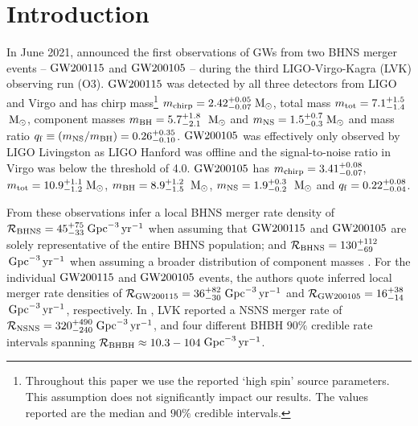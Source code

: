 \documentclass{aastex63}
\newcommand{\Msun}{\ensuremath{\,\rm{M}_{\odot}}\xspace}
\newcommand{\mnsf}{\ensuremath{m_{\rm{NS}}}\xspace}
\newcommand{\mbhf}{\ensuremath{m_{\rm{BH}}}\xspace}
\newcommand{\mtotf}{\ensuremath{m_{\rm{tot}}}\xspace}
\newcommand{\mchirpf}{\ensuremath{{m}_{\rm{chirp}}}\xspace}
\newcommand{\qf}{\ensuremath{q_{\rm{f}}}\xspace}
\newcommand{\Rgwone}{\ensuremath{\mathcal{R}_{\rm{GW200115}}}\xspace}
\newcommand{\Rgwzero}{\ensuremath{\mathcal{R}_{\rm{GW200105}}}\xspace}
\newcommand{\Rbhns}{\ensuremath{\mathcal{R}_{\rm{BHNS}}}\xspace}
\newcommand{\Rbhbh}{\ensuremath{\mathcal{R}_{\rm{BHBH}}}\xspace}
\newcommand{\Rnsns}{\ensuremath{\mathcal{R}_{\rm{NSNS}}}\xspace}
\newcommand{\gwone}{\ensuremath{\rm{GW200115}}\xspace}
\newcommand{\gwzero}{\ensuremath{\rm{GW200105}}\xspace}
\newcommand{\Gpcyr}{\ensuremath{\,\rm{Gpc}^{-3}\,\rm{yr}^{-1}}\xspace}
\begin{document}





\section{Introduction}
\label{sec:introduction}

In June 2021, \citet{Abbott:2021-first-NSBH} announced the first observations of \acp{GW} from  two \ac{BHNS} merger events -- \gwone and \gwzero{} -- during the third LIGO-Virgo-Kagra (LVK) observing run (O3). \gwone was detected by all three detectors from LIGO and Virgo and has chirp mass\footnote{Throughout this paper we use the reported `high spin' source parameters. This assumption does not significantly impact our results. The values reported are the median and $90\%$ credible intervals.} $\mchirpf = 2.42_{-0.07}^{+0.05}$\Msun, total mass $\mtotf = 7.1_{-1.4}^{+1.5}$\Msun, component masses $\mbhf = 5.{7}_{-2.1}^{+1.8}$ $\Msun$ and $\mnsf = 1.{5}_{-0.3}^{+0.7}$\Msun and mass ratio $\qf \equiv (\mnsf / \mbhf) = 0.26_{-0.10}^{+0.35}$.  \gwzero was effectively only observed by LIGO Livingston as LIGO Hanford was offline and the signal-to-noise ratio in Virgo was below the threshold of 4.0. \gwzero has $\mchirpf = 3.41^{+0.08}_{-0.07}$, $\mtotf = 10.9_{-1.2}^{+1.1}$\Msun, $\mbhf = 8.{9}_{-1.5}^{+1.2}$ $\Msun$, $\mnsf = 1.{9}_{-0.2}^{+0.3}$ $\Msun$ and $\qf = 0.22_{-0.04}^{+0.08}$. 

From these observations \citet{Abbott:2021-first-NSBH} infer a local \ac{BHNS} merger rate density of $\Rbhns = {45}_{-33}^{+75}$\Gpcyr when assuming that \gwone and \gwzero are solely representative of the entire \ac{BHNS} population; and  $\Rbhns = {130}_{-69}^{+112}$\Gpcyr when assuming a broader distribution of component masses \citep{Abbott:2021-first-NSBH}. For the individual \gwone and \gwzero events, the authors quote inferred local merger rate densities of  $\Rgwone = {36}_{-30}^{+82}$\Gpcyr and $\Rgwzero = {16}_{-14}^{+38}$\Gpcyr, respectively. In \citet{GWTC2:pop}, LVK reported a \ac{NSNS} merger rate of $\Rnsns = 320^{+490}_{-240}$\Gpcyr, and four different \ac{BHBH} $90\%$ credible rate intervals spanning $\Rbhbh\approx 10.3-104$\Gpcyr.
\end{document}
